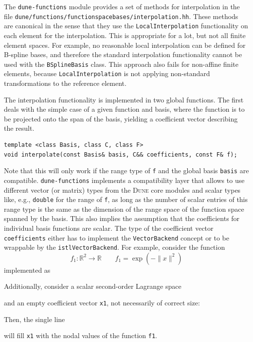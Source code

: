 \documentclass[a4paper,10pt,headings=normal,bibliography=totoc]{scrartcl}
\newcommand{\cpp}[1]{\lstinline[basicstyle=\ttfamily]!#1!}
\newcommand{\R}{\mathbb{R}}
\newcommand{\norm}[1]{\lVert#1\rVert}
\newcommand{\dune}{\textsc{Dune}\xspace}
\newcommand{\dunemodule}[1]{\texttt{#1}}
\newcommand{\file}[1]{\texttt{#1}}
\begin{document}
The \dunemodule{dune-functions} module provides a set of methods for interpolation in the file
\file{dune/functions/functionspacebases/interpolation.hh}.  These methods are canonical in the sense that
they use the \cpp{LocalInterpolation} functionality on each element for the interpolation.  This is appropriate
for a lot, but not all finite element spaces.  For example, no reasonable local interpolation can be defined
for B-spline  bases, and therefore the standard interpolation functionality cannot be used with the
\cpp{BSplineBasis} class.
This approach also fails for non-affine finite elements, because \cpp{LocalInterpolation} is
not applying non-standard transformations to the reference element.

The interpolation functionality is implemented in two global functions.
The first deals with the simple case of a given function and basis,
where the function is to be projected onto the span of the basis, yielding
a coefficient vector describing the result.

\begin{lstlisting}[style=Interface]
template <class Basis, class C, class F>
void interpolate(const Basis& basis, C&& coefficients, const F& f);
\end{lstlisting}
%
Note that this will only work if the range type of \cpp{f}
and the global basis \cpp{basis} are compatible.
\dunemodule{dune-functions} implements a compatibility layer
that allows to use different vector (or matrix) types
from the \dune core modules and scalar types like, e.g., \cpp{double}
for the range of \cpp{f}, as long as the number of scalar entries
of this range type is the same as the dimension of the range space of
the function space spanned by the basis.
This also implies the assumption that the coefficients for
individual basis functions are scalar.
The type of the coefficient vector \cpp{coefficients}
either has to implement the \cpp{VectorBackend}
concept or to be wrappable by the
\cpp{istlVectorBackend}.
For example, consider the function
\begin{equation*}
 f_1 : \R^2 \to \R
 \qquad
 f_1 =  \exp(-\norm{x}^2)
\end{equation*}
implemented as
%

%
Additionally, consider a scalar second-order Lagrange space
%

%
and an empty coefficient vector \cpp{x1}, not necessarily of correct size:
%

%
Then, the single line
%

%
will fill \cpp{x1} with the nodal values of the function \cpp{f1}.
\end{document}
